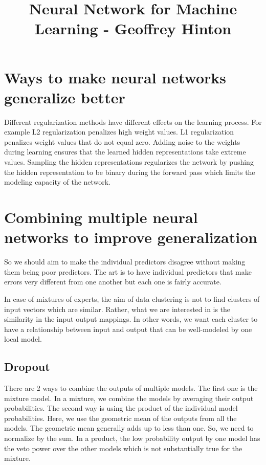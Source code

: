 \documentclass{article}
\title{Neural Network for Machine Learning - Geoffrey Hinton}
\date{}
\author{}
\begin{document}
\maketitle

\newpage

\tableofcontents

\newpage


\section{Ways to make neural networks generalize better}
Different regularization methods have different effects on the learning process. For example L2 regularization penalizes high weight values. L1 regularization penalizes weight values that do not equal zero. Adding noise to the weights during learning ensures that the learned hidden representations take extreme values. Sampling the hidden representations regularizes the network by pushing the hidden representation to be binary during the forward pass which limits the modeling capacity of the network.

\section{Combining multiple neural networks to improve generalization}
So we should aim to make the individual predictors disagree without making them being
poor predictors. The art is to have individual predictors that make errors very different
from one another but each one is fairly accurate.

In case of mixtures of experts, the aim of data clustering is not to find clusters of input
vectors which are similar. Rather, what we are interested in is the similarity in the input
output mappings. In other words, we want each cluster to have a relationship between input and output that can be well-modeled by one local model.

\subsection{Dropout}
There are 2 ways to combine the outputs of multiple models. The first one is the mixture model. In a mixture, we combine the models by averaging their output probabilities. The second way is using the product of the individual model probabilities. Here, we use the geometric mean of the outputs from all the models. The geometric mean generally adds up to less than one. So, we need to normalize by the sum. In a product, the low probability output by one model has the veto power over the other models which is not substantially true for the mixture. 
\end{document}
